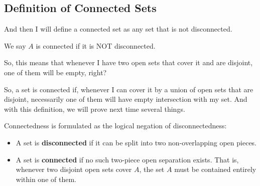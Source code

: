 \subsection{Definition of Connected Sets}

\begin{speech}[01:25:29 - 01:26:52]
And then I will define a connected set as any set that is not disconnected.

We say $A$ is connected if it is NOT disconnected. 

So, this means that whenever I have two open sets that cover it and are disjoint, one of them will be empty, right?

So, a set is connected if, whenever I can cover it by a union of open sets that are disjoint, necessarily one of them will have empty intersection with my set. And with this definition, we will prove next time several things. 
\end{speech}

\begin{content}

\begin{steps}
Connectedness is formulated as the logical negation of disconnectedness:
\begin{itemize}
    \item A set is \textbf{disconnected} if it can be split into two non-overlapping open pieces.
    \item A set is \textbf{connected} if no such two-piece open separation exists. That is, whenever two disjoint open sets cover $A$, the set $A$ must be contained entirely within one of them.
\end{itemize}
\end{steps}
\end{content}

